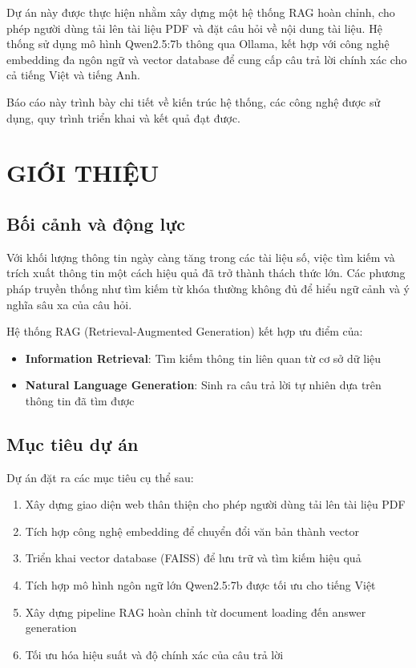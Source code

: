 \documentclass[12pt,a4paper]{report}
\begin{document}
Dự án này được thực hiện nhằm xây dựng một hệ thống RAG hoàn chỉnh, cho phép người dùng tải lên tài liệu PDF và đặt câu hỏi về nội dung tài liệu. Hệ thống sử dụng mô hình Qwen2.5:7b thông qua Ollama, kết hợp với công nghệ embedding đa ngôn ngữ và vector database để cung cấp câu trả lời chính xác cho cả tiếng Việt và tiếng Anh.

Báo cáo này trình bày chi tiết về kiến trúc hệ thống, các công nghệ được sử dụng, quy trình triển khai và kết quả đạt được.

\newpage

\chapter{GIỚI THIỆU}

\section{Bối cảnh và động lực}

Với khối lượng thông tin ngày càng tăng trong các tài liệu số, việc tìm kiếm và trích xuất thông tin một cách hiệu quả đã trở thành thách thức lớn. Các phương pháp truyền thống như tìm kiếm từ khóa thường không đủ để hiểu ngữ cảnh và ý nghĩa sâu xa của câu hỏi.

Hệ thống RAG (Retrieval-Augmented Generation) kết hợp ưu điểm của:
\begin{itemize}
    \item \textbf{Information Retrieval}: Tìm kiếm thông tin liên quan từ cơ sở dữ liệu
    \item \textbf{Natural Language Generation}: Sinh ra câu trả lời tự nhiên dựa trên thông tin đã tìm được
\end{itemize}

\section{Mục tiêu dự án}

Dự án đặt ra các mục tiêu cụ thể sau:
\begin{enumerate}
    \item Xây dựng giao diện web thân thiện cho phép người dùng tải lên tài liệu PDF
    \item Tích hợp công nghệ embedding để chuyển đổi văn bản thành vector
    \item Triển khai vector database (FAISS) để lưu trữ và tìm kiếm hiệu quả
    \item Tích hợp mô hình ngôn ngữ lớn Qwen2.5:7b được tối ưu cho tiếng Việt
    \item Xây dựng pipeline RAG hoàn chỉnh từ document loading đến answer generation
    \item Tối ưu hóa hiệu suất và độ chính xác của câu trả lời
\end{enumerate}
\end{document}
